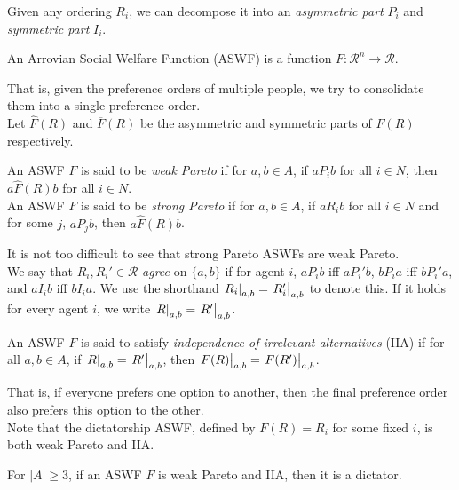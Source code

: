 	Given any ordering $R_i$, we can decompose it into an \emph{asymmetric part} $P_i$ and \emph{symmetric part} $I_i$.

	\begin{fdef}
		An Arrovian Social Welfare Function (ASWF) is a function $F : \mathcal{R}^n \to \mathcal{R}$.
	\end{fdef}
	That is, given the preference orders of multiple people, we try to consolidate them into a single preference order.\\
	Let $\hat{F}(R)$ and $\overline{F}(R)$ be the asymmetric and symmetric parts of $F(R)$ respectively.

	\begin{fdef}[Pareto]
		An ASWF $F$ is said to be \emph{weak Pareto} if for $a,b \in A$, if $a P_i b$ for all $i \in N$, then $a \hat{F}(R) b$ for all $i \in N$.\\ %
		An ASWF $F$ is said to be \emph{strong Pareto} if for $a,b \in A$, if $a R_i b$ for all $i \in N$ and for some $j$, $a P_j b$, then $a \hat{F}(R) b$.
	\end{fdef}

	It is not too difficult to see that strong Pareto ASWFs are weak Pareto.\\
	We say that $R_i,R_i'\in\mathcal{R}$ \emph{agree} on $\{a,b\}$ if for agent $i$, $a P_i b$ iff $a P_i' b$, $b P_i a$ iff $b P_i' a$, and $a I_i b$ iff $b I_i a$. We use the shorthand $\left.R_i\right|_{a,b} = \left.R_i'\right|_{a,b}$ to denote this. If it holds for every agent $i$, we write $\left.R\right|_{a,b} = \left.R'\right|_{a,b}$.

	\begin{fdef}
		An ASWF $F$ is said to satisfy \emph{independence of irrelevant alternatives} (IIA) if for all $a,b \in A$, if $\left.R\right|_{a,b} = \left.R'\right|_{a,b}$, then $\left.F(R)\right|_{a,b} = \left.F(R')\right|_{a,b}$.
	\end{fdef}
	That is, if everyone prefers one option to another, then the final preference order also prefers this option to the other.\\
	Note that the dictatorship ASWF, defined by $F(R) = R_i$ for some fixed $i$, is both weak Pareto and IIA.

	\begin{ftheo}[Arrow]
		\label{arrow}
		For $|A| \ge 3$, if an ASWF $F$ is weak Pareto and IIA, then it is a dictator.
	\end{ftheo}

